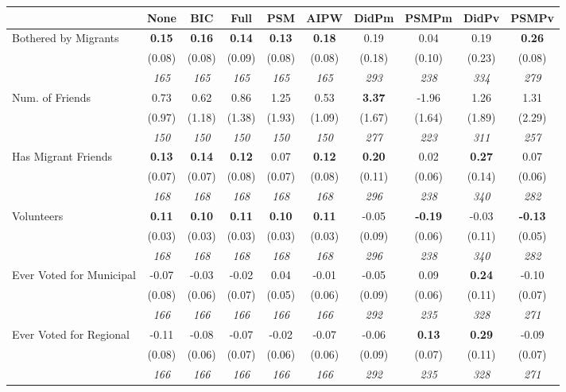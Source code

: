 \begin{tabular}{l c c c c c c c c c}
\toprule
 & None & BIC & Full & PSM & AIPW & DidPm & PSMPm & DidPv & PSMPv \\
\midrule
Bothered by Migrants & \textbf{ 0.15 } & \textbf{ 0.16 } & \textbf{ 0.14 } & \textbf{0.13} & \textbf{0.18} & 0.19 & 0.04 & 0.19 & \textbf{0.26} \\
& (0.08) & (0.08) & (0.09) & (0.08) & (0.08) & (0.18) & (0.10) & (0.23) & (0.08) \\
& \textit{ 165 } & \textit{ 165 } & \textit{ 165 } & \textit{ 165 } & \textit{ 165 } & \textit{ 293 } & \textit{ 238 } & \textit{ 334 } & \textit{ 279 } \\
Num. of Friends & 0.73 & 0.62 & 0.86 & 1.25 & 0.53 & \textbf{ 3.37 } & -1.96 & 1.26 & 1.31 \\
& (0.97) & (1.18) & (1.38) & (1.93) & (1.09) & (1.67) & (1.64) & (1.89) & (2.29) \\
& \textit{ 150 } & \textit{ 150 } & \textit{ 150 } & \textit{ 150 } & \textit{ 150 } & \textit{ 277 } & \textit{ 223 } & \textit{ 311 } & \textit{ 257 } \\
Has Migrant Friends & \textbf{ 0.13 } & \textbf{ 0.14 } & \textbf{ 0.12 } & 0.07 & \textbf{0.12} & \textbf{ 0.20 } & 0.02 & \textbf{ 0.27 } & 0.07 \\
& (0.07) & (0.07) & (0.08) & (0.07) & (0.08) & (0.11) & (0.06) & (0.14) & (0.06) \\
& \textit{ 168 } & \textit{ 168 } & \textit{ 168 } & \textit{ 168 } & \textit{ 168 } & \textit{ 296 } & \textit{ 238 } & \textit{ 340 } & \textit{ 282 } \\
Volunteers & \textbf{ 0.11 } & \textbf{ 0.10 } & \textbf{ 0.11 } & \textbf{0.10} & \textbf{0.11} & -0.05 & \textbf{-0.19} & -0.03 & \textbf{-0.13} \\
& (0.03) & (0.03) & (0.03) & (0.03) & (0.03) & (0.09) & (0.06) & (0.11) & (0.05) \\
& \textit{ 168 } & \textit{ 168 } & \textit{ 168 } & \textit{ 168 } & \textit{ 168 } & \textit{ 296 } & \textit{ 238 } & \textit{ 340 } & \textit{ 282 } \\
Ever Voted for Municipal & -0.07 & -0.03 & -0.02 & 0.04 & -0.01 & -0.05 & 0.09 & \textbf{ 0.24 } & -0.10 \\
& (0.08) & (0.06) & (0.07) & (0.05) & (0.06) & (0.09) & (0.06) & (0.11) & (0.07) \\
& \textit{ 166 } & \textit{ 166 } & \textit{ 166 } & \textit{ 166 } & \textit{ 166 } & \textit{ 292 } & \textit{ 235 } & \textit{ 328 } & \textit{ 271 } \\
Ever Voted for Regional & -0.11 & -0.08 & -0.07 & -0.02 & -0.07 & -0.06 & \textbf{0.13} & \textbf{ 0.29 } & -0.09 \\
& (0.08) & (0.06) & (0.07) & (0.06) & (0.06) & (0.09) & (0.07) & (0.11) & (0.07) \\
& \textit{ 166 } & \textit{ 166 } & \textit{ 166 } & \textit{ 166 } & \textit{ 166 } & \textit{ 292 } & \textit{ 235 } & \textit{ 328 } & \textit{ 271 } \\
\bottomrule
\end{tabular}
